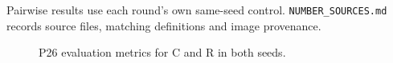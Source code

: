 \documentclass[11pt]{article}
\begin{document}
Pairwise results use each round's own same-seed control. \texttt{NUMBER\_SOURCES.md} records source files, matching definitions and image provenance.
\begin{figure}[H]\centering\caption{P26 evaluation metrics for C and R in both seeds.}\end{figure}
\end{document}
